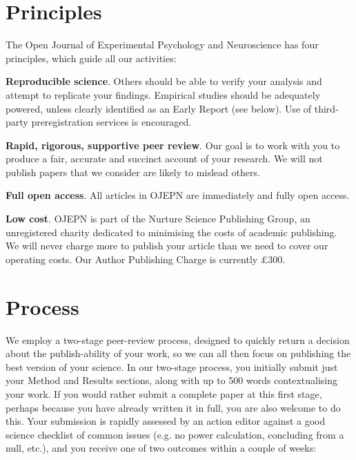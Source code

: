 \documentclass[twocolumn]{article}
\let\tempthree\enumerate
\let\tempfour\endenumerate
\renewenvironment{enumerate}{\tempthree\setlength{\itemsep}{0pt}}{\tempfour}
\begin{document}
\section{Principles}

The Open Journal of Experimental Psychology and Neuroscience has four principles, which guide all our activities:

\begin{enumerate}

\item \textbf{Reproducible science}. Others should be able to verify your analysis and attempt to replicate your findings. Empirical studies should be adequately powered, unless clearly identified as an Early Report (see below). Use of third-party preregistration services is encouraged.

\item \textbf{Rapid, rigorous, supportive peer review}. Our goal is to work with you to produce a fair, accurate and succinct account of your research. We will not publish papers that we consider are likely to mislead others. 
  
\item \textbf{Full open access}. All articles in OJEPN are immediately and fully open access.

\item \textbf{Low cost}. OJEPN is part of the Nurture Science Publishing Group, an unregistered charity dedicated to minimising the costs of academic publishing. We will never charge more to publish your article than we need to cover our operating costs. Our Author Publishing Charge is currently £300.

\end{enumerate}

  
\section{Process} 

We employ a two-stage peer-review process, designed to quickly return a decision about the publish-ability of your work, so we can all then focus on publishing the best version of your science. In our two-stage process, you initially submit just your Method and Results sections, along with up to 500 words contextualising your work. If you would rather submit a complete paper at this first stage, perhaps because you have already written it in full, you are also welcome to do this. Your submission is rapidly assessed by an action editor against a good science checklist of common issues (e.g. no power calculation, concluding from a null, etc.), and you receive one of two outcomes within a couple of weeks:
\end{document}

